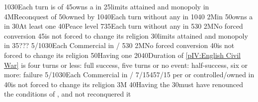 
 
%
%
{10}{30}{Each turn \paysEcosse is \VASSAL of \ANG}%
%
%
{}{45}{\ANG owns a \Presidio in \provincePicardie}%
%
%
{}{25}{\MNU limits attained and monopoly in }%
%
\EUobjective4M{Reconquest of \provinceGuyenne}{}%
{}{50}{\provinceGuyenne owned by \paysmajeurAngleterre}%
%
%
{10}{40}{Each turn without any \REVOLT in \regionIrlande}%
%
%
%
{10}{40}{}%
%
\EUobjective2M{\Presidio in \provincePicardie}{}%
{}{50}{\ANG owns a \Presidio in \provincePicardie}%
%
%
{}{30}{At least one \COL}%
%
%
{}{40}{Peace level }%
%
%
{7}{35}{Each turn without any \REVOLT in \regionIrlande}
%
%
%
{5}{30}{}%
%
\EUobjective2M{No forced conversion}{}%
{}{45}{\ANG is not forced to change its religion}%
%
%
{}{30}{\MNU limits attained and monopoly in }%
%
%
%
{}{35}{???}%
%
%
{5/10}{30}{Each Commercial  in \CTZ/\STZ}
%
%
%
{5}{30}{}%
%
\EUobjective2M{No forced conversion}{}%
{}{40}{\ANG is not forced to change its religion}%
%
%
{}{50}{Having one }%
%
%
{20}{40}{Duration of \ref{pIV:English Civil War} is four turns or less: full
  success, five turns or no event: half-success, six or more: failure}%
%
%
{5/10}{30}{Each Commercial  in \CTZ/\STZ}
%
%
%
{7/15}{45}{7/15 \VPs per \TP or \COL controlled/owned in \continentCaraibes}%
%
%
{}{40}{\ANG is not forced to change its religion}%
%
\EUobjective3M{}{}%
{}{40}{Having the }%
%
%
{}{30}{\HIS must have renounced the conditions of , and not reconquered it}%
%
